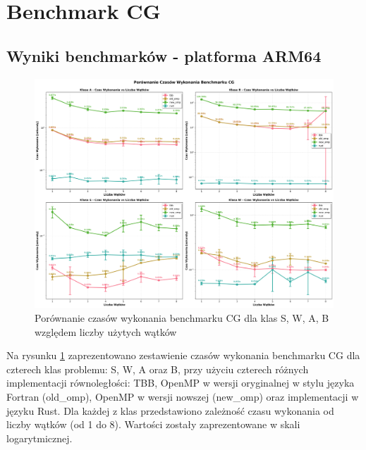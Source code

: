 
\section{Benchmark CG}
\subsection{Wyniki benchmarków - platforma ARM64}

\begin{figure}[H]
    \centering
    \includegraphics[width=\textwidth]{analiza/images/parallel/cg/cg_porownanie_czasow_wykonania.png}
    \caption{Porównanie czasów wykonania benchmarku CG dla klas S, W, A, B względem liczby użytych wątków}
    \label{cg_porownanie_czasow_wykonania}
\end{figure}

Na rysunku \ref{cg_porownanie_czasow_wykonania} zaprezentowano zestawienie czasów wykonania benchmarku CG dla czterech klas problemu: S, W, A oraz B, przy użyciu czterech różnych implementacji równoległości: TBB, OpenMP w wersji oryginalnej w stylu języka Fortran (old\_omp), OpenMP w wersji nowszej (new\_omp) oraz implementacji w języku Rust. Dla każdej z klas przedstawiono zależność czasu wykonania od liczby wątków (od 1 do 8). Wartości zostały zaprezentowane w skali logarytmicznej.

